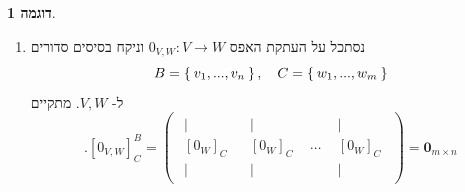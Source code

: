\documentclass[12pt]{report}
\theoremstyle{plain}
\theoremstyle{definition}
\newtheorem{example}{דוגמה}[chapter]
\newcommand{\0}{\mathbf{0}}
\begin{document}
\begin{example}
\begin{enumerate}[label=\alph*.]
$$\begin{aligned}
&=\begin{pmatrix}
\begin{array}{c}
|\\[-0.4ex]
\left[\begin{pmatrix}
1 & 0 \\
0 & 0
\end{pmatrix}\right]_E\\[-0.4ex]
|
\end{array}
&
\begin{array}{c}
|\\[-0.4ex]
\left[\begin{pmatrix}
0 & 0 \\
1 & 0
\end{pmatrix}\right]_E\\[-0.4ex]
|
\end{array}
&
\begin{array}{c}
|\\[-0.4ex]
\left[\begin{pmatrix}
0 & 1 \\
0 & 0
\end{pmatrix}\right]_E\\[-0.4ex]
|
\end{array}
&
\begin{array}{c}
|\\[-0.4ex]
\left[\begin{pmatrix}
0 & 0 \\
0 & 1
\end{pmatrix}\right]_E\\[-0.4ex]
|
\end{array}
\end{pmatrix} \\
&=\begin{pmatrix}
1 & 0 & 0 & 0 \\
0 & 0 & 1 & 0 \\
0 & 1 & 0 & 0 \\
0 & 0 & 0 & 1
\end{pmatrix}
\end{aligned}
$$


\item
נסתכל על העתקת האפס
$0_{V,W}:V\to W$
וניקח בסיסים סדורים
$$
B=\Set{v_1,...,v_n},\quad C=\Set{w_1,...,w_m}
$$
ל-
$V,W$.
מתקיים
$$
.[0_{V,W}]_C^B=\begin{pmatrix}
\begin{array}{c}
|\\[-0.4ex]
[0_W]_C\\[-0.4ex]
|
\end{array}
&
\begin{array}{c}
|\\[-0.4ex]
[0_W]_C\\[-0.4ex]
|
\end{array}
&
\cdots
&
\begin{array}{c}
|\\[-0.4ex]
[0_W]_C\\[-0.4ex]
|
\end{array}
\end{pmatrix}=\0_{m\times n}
$$


\end{enumerate}
\end{example}
\end{document}

